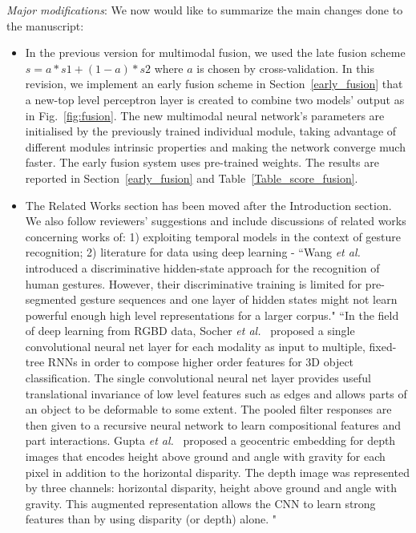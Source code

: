 \documentclass[12pt]{article}
\begin{document}
{\noindent \em Major modifications}: We now would like to summarize the main changes done to the manuscript:

\begin{itemize}
\item In the previous version for multimodal fusion, we used the late fusion scheme  $s = a * s1 + (1-a)*s2$ where $a$ is chosen by cross-validation. In this revision, we implement an early fusion scheme in Section~\ref{early_fusion} that a new-top level perceptron layer is created to combine two models' output as in Fig.~\ref{fig:fusion}. The new multimodal neural network's parameters are initialised by the previously trained individual module, taking advantage of different modules intrinsic properties and making the network converge much faster. The early fusion system uses pre-trained weights. The results are reported in  Section~\ref{early_fusion} and Table~\ref{Table_score_fusion}.

\item The Related Works section has been moved after the Introduction section. We also follow reviewers' suggestions and include discussions of related works concerning works of: 1) exploiting temporal models in the context of gesture recognition; 2) literature for \RGBD data using deep learning -
    ``Wang \emph{et al.}~\cite{wang2006hidden} introduced a discriminative hidden-state approach for the recognition of human gestures. However, their discriminative training is limited for pre-segmented gesture sequences and one layer of hidden states might not learn powerful enough high level representations for a larger corpus."
    ``In the field of deep learning from RGBD data, Socher \emph{et al.}~\cite{socher2012convolutional} proposed a single convolutional neural net layer for each modality as input to multiple, fixed-tree RNNs in order to compose higher order features for 3D object classification. The single convolutional neural net layer provides useful translational invariance of low level features such as edges and allows parts of an object to be deformable to some extent. The pooled filter responses are then given to a recursive neural network to learn compositional features and part interactions.
    Gupta \emph{et al.}~\cite{gupta2014learning} proposed a geocentric embedding for depth images that encodes height above ground and angle with gravity for each pixel in addition to the horizontal disparity. The depth image was represented by three channels: horizontal disparity, height above ground and angle with gravity. This augmented representation allows the CNN to learn strong features than by using disparity (or depth) alone. "


\end{itemize}
\end{document}
